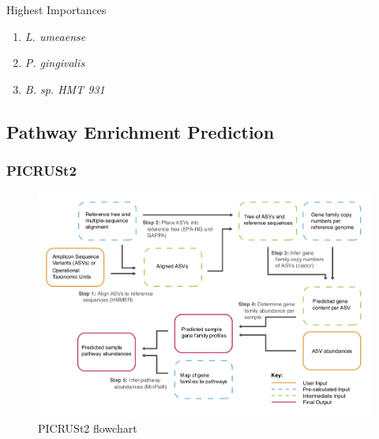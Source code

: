 \documentclass{beamer}
\begin{document}
\begin{frame}[allowframebreaks]
        \begin{block}{Highest Importances}
            \begin{enumerate}
                \item \textit{L. umeaense}
                \item \textit{P. gingivalis}
                \item \textit{B. sp. HMT 931}
            \end{enumerate}
        \end{block}
    \end{frame}

    \subsection{Pathway Enrichment Prediction}
    \begin{frame}
        \frametitle{PICRUSt2}

        \begin{figure}
            \includegraphics[width=0.8 \linewidth]{figures/PICRUSt2.png}
            \caption{PICRUSt2 flowchart \protect\cite{PICRUSt2-1}}
        \end{figure}
    \end{frame}
\end{document}
